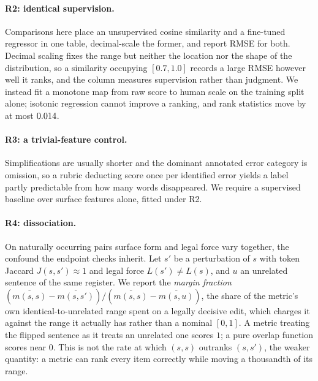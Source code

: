 \documentclass[11pt]{article}
\begin{document}
\paragraph{R2: identical supervision.}
Comparisons here place an unsupervised cosine similarity and a fine-tuned
regressor in one table, decimal-scale the former, and report RMSE for both.
Decimal scaling fixes the range but neither the location nor the shape of the
distribution, so a similarity occupying $[0.7,1.0]$ records a large RMSE however
well it ranks, and the column measures supervision rather than judgment.
We instead fit a monotone map from raw score to human scale on the training
split alone; isotonic regression cannot improve a ranking, and rank statistics
move by at most $0.014$.

\paragraph{R3: a trivial-feature control.}
Simplifications are usually shorter and the dominant annotated error category is
omission, so a rubric deducting score once per identified error yields a label
partly predictable from how many words disappeared. We require a supervised
baseline over surface features alone, fitted under R2.

\paragraph{R4: dissociation.}
On naturally occurring pairs surface form and legal force vary together, the
confound the endpoint checks inherit. Let $s'$ be a perturbation of $s$ with
token Jaccard $J(s,s') \approx 1$ and legal force $L(s') \neq L(s)$, and $u$ an
unrelated sentence of the same register. We report the \emph{margin fraction}
$(\overline{m(s,s)} - \overline{m(s,s')}) /
 (\overline{m(s,s)} - \overline{m(s,u)})$, the share of the metric's own
identical-to-unrelated range spent on a legally decisive edit, which charges it
against the range it actually has rather than a nominal $[0,1]$. A metric
treating the flipped sentence as it treats an unrelated one scores $1$; a pure
overlap function scores near $0$. This is not the rate at which $(s,s)$ outranks
$(s,s')$, the weaker quantity: a metric can rank every item correctly while
moving a thousandth of its range.

\begin{table}[tb]\centering\footnotesize

\caption{\textsc{LegalEdit}, min--max normalised per metric. \emph{discrim.} is
the share of items ranked correctly (identical $>$ edited), \emph{margin} the
fraction of the identical-to-unrelated range spent on the legal edit.}
\label{tab:challenge}
\end{table}
\end{document}
